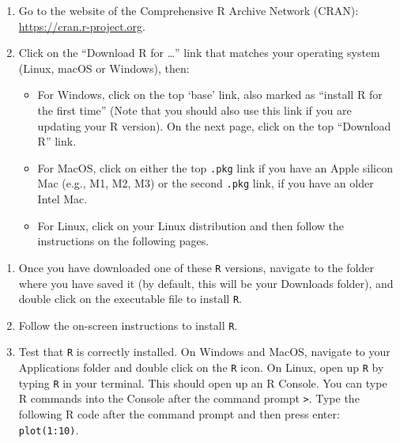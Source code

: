 \documentclass[
  letterpaper,
  DIV=11,
  numbers=noendperiod,
  oneside]{scrreprt}
\providecommand{\tightlist}{%
  \setlength{\itemsep}{0pt}\setlength{\parskip}{0pt}}\usepackage{longtable,booktabs,array}
\begin{document}
\begin{enumerate}
\def\labelenumi{\arabic{enumi}.}
\item
  Go to the website of the Comprehensive R Archive Network (CRAN):
  \url{https://cran.r-project.org}.
\item
  Click on the ``Download R for \ldots{}'' link that matches your
  operating system (Linux, macOS or Windows), then:

  \begin{itemize}
  \tightlist
  \item
    For Windows, click on the top `base' link, also marked as ``install
    R for the first time'' (Note that you should also use this link if
    you are updating your R version). On the next page, click on the top
    ``Download R'' link.
  \item
    For MacOS, click on either the top \texttt{.pkg} link if you have an
    Apple silicon Mac (e.g., M1, M2, M3) or the second \texttt{.pkg}
    link, if you have an older Intel Mac.
  \item
    For Linux, click on your Linux distribution and then follow the
    instructions on the following pages.
  \end{itemize}
\end{enumerate}

\begin{enumerate}
\def\labelenumi{\arabic{enumi}.}
\setcounter{enumi}{2}
\item
  Once you have downloaded one of these \texttt{R} versions, navigate to
  the folder where you have saved it (by default, this will be your
  Downloads folder), and double click on the executable file to install
  \texttt{R}.
\item
  Follow the on-screen instructions to install \texttt{R}.
\item
  Test that \texttt{R} is correctly installed. On Windows and MacOS,
  navigate to your Applications folder and double click on the
  \texttt{R} icon. On Linux, open up \texttt{R} by typing \texttt{R} in
  your terminal. This should open up an R Console. You can type R
  commands into the Console after the command prompt
  \texttt{\textgreater{}}. Type the following R code after the command
  prompt and then press enter: \texttt{plot(1:10)}.
\end{enumerate}
\end{document}
